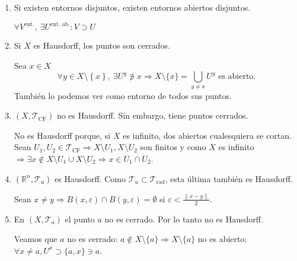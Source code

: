 \begin{obs}
\begin{enumerate}
    \item Si existen entornos disjuntos, existen entornos abiertos disjuntos.
    \begin{demo}
        $\forall V^{\text{ent.}},\ \exists U^{\text{ent. ab.}}: V \supset U$
    \end{demo}
    \item Si $X$ es Hausdorff, los puntos son cerrados.
    \begin{demo}    
    Sea $x \in X$
    \[
    \forall y \in X \setminus \left\{ x \right\},\ \exists U^y \not\ni x \Rightarrow X \setminus \{x\} = \bigcup_{y \neq x} U^y  \text{ es abierto.} 
    \]
    También lo podemos ver como entorno de todos sus puntos.
    \end{demo}
    \item $\left( X, \mathcal{T}_{\text{CF}} \right)$ no es Hausdorff. Sin embargo, tiene puntos cerrados.
    \begin{demo}
        No es Hausdorff porque, si $X$ es infinito, dos abiertos cualesquiera se cortan.
        Sean $U_1, U_2 \in \mathcal{T}_{\text{CF}} \Rightarrow X \setminus U_1, X \setminus U_2$ son finitos y como $X$ es infinito $\Rightarrow \exists x \not\in X \setminus U_1 \cup X \setminus U_2 \Rightarrow x \in U_1 \cap U_2$.
    \end{demo}

    \item $\left( \mathbb{R}^n, \mathcal{T}_{u} \right)$ es Hausdorff. Como $\mathcal{T}_{u} \subset \mathcal{T}_{\text{rad}}$, esta última también es Hausdorff.
    \begin{demo}    
    Sean $x \neq y \Rightarrow B\left( x, \varepsilon \right) \cap B\left( y, \varepsilon \right) = \emptyset$ si $\varepsilon < \frac{\lVert x - y \rVert}{2}$.
    \end{demo}

    \item En $\left( X, \mathcal{T}_a \right)$ el punto $a$ no es cerrado. Por lo tanto no es Hausdorff. 
    \begin{demo}
    Veamos que $a$ no es cerrado: $a \not\in X \setminus \{a\} \Rightarrow X \setminus \{a\}$ no es abierto: $\forall x \neq a, U^x \supset \{a, x\} \ni a$.   
    \end{demo}
\end{enumerate}
\end{obs}

